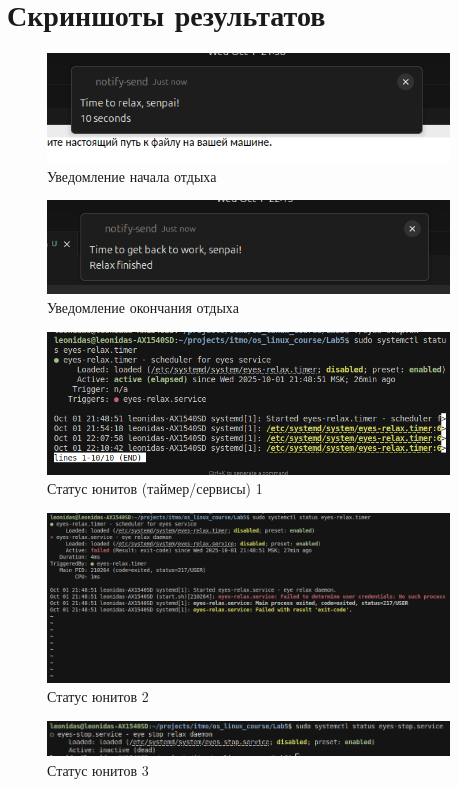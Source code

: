 \section{Скриншоты результатов}
\begin{figure}[H]
  \centering
  \includegraphics[width=0.95\textwidth]{results/image1.png}
  \caption{Уведомление начала отдыха}
\end{figure}
\begin{figure}[H]
  \centering
  \includegraphics[width=0.95\textwidth]{results/image3.png}
  \caption{Уведомление окончания отдыха}
\end{figure}
\begin{figure}[H]
  \centering
  \includegraphics[width=0.95\textwidth]{results/status1.png}
  \caption{Статус юнитов (таймер/сервисы) 1}
\end{figure}
\begin{figure}[H]
  \centering
  \includegraphics[width=0.95\textwidth]{results/status2.png}
  \caption{Статус юнитов 2}
\end{figure}
\begin{figure}[H]
  \centering
  \includegraphics[width=0.95\textwidth]{results/status3.png}
  \caption{Статус юнитов 3}
\end{figure}
